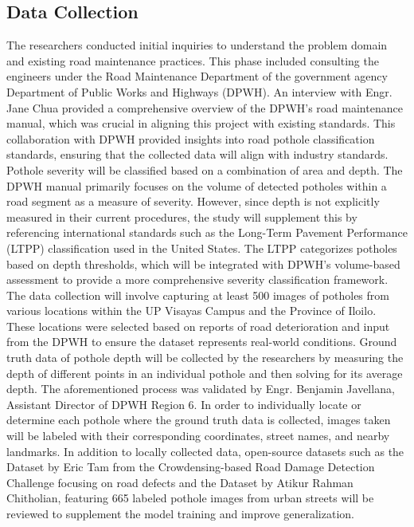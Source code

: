 \subsection{\textbf{Data Collection} }
The researchers conducted initial inquiries to understand the problem domain and existing road maintenance practices. This phase included consulting the engineers under the Road Maintenance Department of the government agency Department of Public Works and Highways (DPWH). An interview with Engr. Jane Chua provided a comprehensive overview of the DPWH's road maintenance manual, which was crucial in aligning this project with existing standards. This collaboration with DPWH provided insights into road pothole classification standards, ensuring that the collected data will align with industry standards. Pothole severity will be classified based on a combination of area and depth. The DPWH manual primarily focuses on the volume of detected potholes within a road segment as a measure of severity. However, since depth is not explicitly measured in their current procedures, the study will supplement this by referencing international standards such as the Long-Term Pavement Performance (LTPP) classification used in the United States. The LTPP categorizes potholes based on depth thresholds, which will be integrated with DPWH’s volume-based assessment to provide a more comprehensive severity classification framework. The data collection will involve capturing at least 500 images of potholes from various locations within the UP Visayas Campus and the Province of Iloilo. These locations were selected based on reports of road deterioration and input from the DPWH to ensure the dataset represents real-world conditions. Ground truth data of pothole depth will be collected by the researchers by measuring the depth of different points in an individual pothole and then solving for its average depth. The aforementioned process was validated by Engr. Benjamin Javellana, Assistant Director of DPWH Region 6. In order to individually locate or determine each pothole where the ground truth data is collected, images taken will be labeled with their corresponding coordinates, street names, and nearby landmarks.  In addition to locally collected data, open-source datasets such as the Dataset by Eric Tam from the Crowdensing-based Road Damage Detection Challenge focusing on road defects and the Dataset by Atikur Rahman Chitholian, featuring 665 labeled pothole images from urban streets will be reviewed to supplement the model training and improve generalization.


